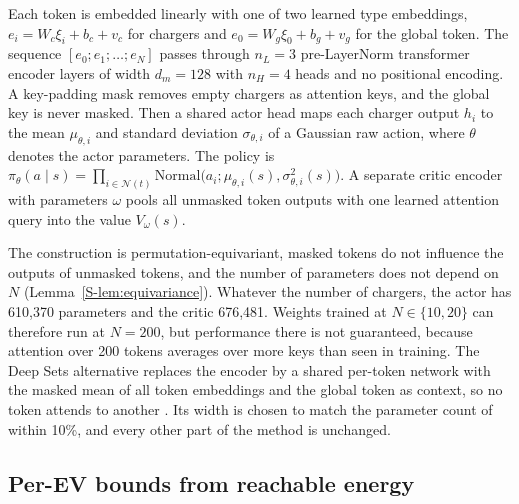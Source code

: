 Each token is embedded linearly with one of two learned type embeddings, $e_i=W_c\xi_i+b_c+v_c$ for chargers and $e_0=W_g\xi_0+b_g+v_g$ for the global token.
The sequence $[e_0;e_1;\dots;e_N]$ passes through $n_L=3$ pre-LayerNorm transformer encoder layers \cite{vaswani2017attention,ba2016layer,xiong2020layer} of width $d_m=128$ with $n_H=4$ heads and no positional encoding.
A key-padding mask removes empty chargers as attention keys, and the global key is never masked.
Then a shared actor head maps each charger output $h_i$ to the mean $\mu_{\theta,i}$ and standard deviation $\sigma_{\theta,i}$ of a Gaussian raw action, where $\theta$ denotes the actor parameters.
The policy is $\pi_\theta(a\mid s)=\prod_{i\in\mathcal N(t)}\mathrm{Normal}\big(a_i;\mu_{\theta,i}(s),\sigma_{\theta,i}^2(s)\big)$.
A separate critic encoder with parameters $\omega$ pools all unmasked token outputs with one learned attention query \cite{lee2019set} into the value $V_\omega(s)$.

The construction is permutation-equivariant, masked tokens do not influence the outputs of unmasked tokens, and the number of parameters does not depend on $N$ (Lemma~\ref{S-lem:equivariance}).
Whatever the number of chargers, the actor has 610,370 parameters and the critic 676,481.
Weights trained at $N\in\{10,20\}$ can therefore run at $N=200$, but performance there is not guaranteed, because attention over 200 tokens averages over more keys than seen in training.
The Deep Sets alternative replaces the encoder by a shared per-token network with the masked mean of all token embeddings and the global token as context, so no token attends to another \cite{zaheer2017deep}.
Its width is chosen to match the parameter count of \method{} within 10\%, and every other part of the method is unchanged.

\subsection{Per-EV bounds from reachable energy}\label{sec:bounds}

